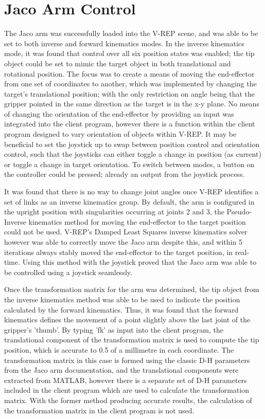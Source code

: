 \documentclass[12pt,openany,a4paper]{book}
\begin{document}
\section{Jaco Arm Control}
The Jaco arm was successfully loaded into the V-REP scene, and was able to be set to both inverse and forward kinematics modes. In the inverse kinematics mode, it was found that control over all six position states was enabled; the tip object could be set to mimic the target object in both translational and rotational position. The focus was to create a means of moving the end-effector from one set of coordinates to another, which was implemented by changing the target's translational position; with the only restriction on angle being that the gripper pointed in the same direction as the target is in the x-y plane. No means of changing the orientation of the end-effector by providing an input was integrated into the client program, however there is a function within the client program designed to vary orientation of objects within V-REP. It may be beneficial to set the joystick up to swap between position control and orientation control, such that the joysticks can either toggle a change in position (as current) or toggle a change in target orientation. To switch between modes, a button on the controller could be pressed; already an output from the joystick process.

It was found that there is no way to change joint angles once V-REP identifies a set of links as an inverse kinematics group. By default, the arm is configured in the upright position with singularities occurring at joints 2 and 3, the Pseudo-Inverse kinematics method for moving the end-effector to the target position could not be used. V-REP's Damped Least Squares inverse kinematics solver however was able to correctly move the Jaco arm despite this, and within 5 iterations always stably moved the end-effector to the target position, in real-time. Using this method with the joystick proved that the Jaco arm was able to be controlled using a joystick seamlessly. 

Once the transformation matrix for the arm was determined, the tip object from the inverse kinematics method was able to be used to indicate the position calculated by the forward kinematics. Thus, it was found that the forward kinematics defines the movement of a point slightly above the last joint of the gripper's 'thumb'. By typing 'fk' as input into the client program, the translational component of the transformation matrix is used to compute the tip position, which is accurate to 0.5 of a millimetre in each coordinate. The transformation matrix in this case is formed using the classic D-H parameters from the Jaco arm documentation, and the translational components were extracted from MATLAB, however there is a separate set of D-H parameters included in the client program which are used to calculate the transformation matrix. With the former method producing accurate results, the calculation of the transformation matrix in the client program is not used.
\end{document}
